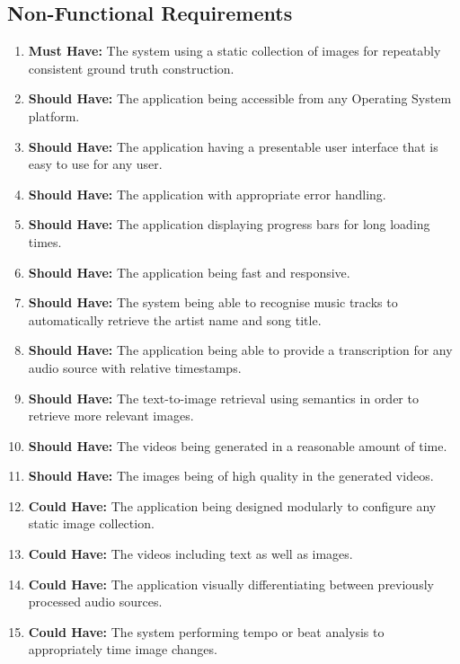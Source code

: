 \documentclass{l4proj}
\begin{document}
\subsection{Non-Functional Requirements}
\begin{enumerate}[resume]
    \item \label{req:18} \textbf{Must Have:} The system using a static collection of images for repeatably consistent ground truth construction.
    \item \label{req:19} \textbf{Should Have:} The application being accessible from any Operating System platform.
    \item \label{req:20} \textbf{Should Have:} The application having a presentable user interface that is easy to use for any user.
    \item \label{req:21} \textbf{Should Have:} The application with appropriate error handling.
    \item \label{req:22} \textbf{Should Have:} The application displaying progress bars for long loading times.
    \item \label{req:23} \textbf{Should Have:} The application being fast and responsive.
    \item \label{req:24} \textbf{Should Have:} The system being able to recognise music tracks to automatically retrieve the artist name and song title.
    \item \label{req:25} \textbf{Should Have:} The application being able to provide a transcription for any audio source with relative timestamps.
    \item \label{req:26} \textbf{Should Have:} The text-to-image retrieval using semantics in order to retrieve more relevant images.
    \item \label{req:27} \textbf{Should Have:} The videos being generated in a reasonable amount of time.
    \item \label{req:28} \textbf{Should Have:} The images being of high quality in the generated videos.
    \item \label{req:29} \textbf{Could Have:} The application being designed modularly to configure any static image collection.
    \item \label{req:30} \textbf{Could Have:} The videos including text as well as images.
    \item \label{req:31} \textbf{Could Have:} The application visually differentiating between previously processed audio sources.
    \item \label{req:32} \textbf{Could Have:} The system performing tempo or beat analysis to appropriately time image changes.
    
\end{enumerate}
\end{document}

